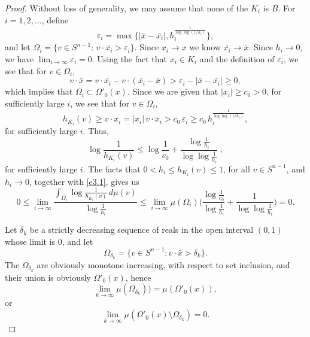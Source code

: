 \documentclass{cpamart1}     %
\theoremstyle{definition}
\theoremstyle{remark}
\newcommand{\sn}{S^{n-1}}
\begin{document}
\begin{proof}
Without loss of generality, we may assume that none of the $K_i$ is $B$.
For $i=1,2,\ldots$, define
\begin{equation*}
 \varepsilon_i=\max\big\{|\bar{x}-\bar{x_i}|,h_i^{\frac1{\log \log(1/h_i)}}\big\},
\end{equation*}
and let $\Omega_i=\{v\in S^{n-1}:\,v\cdot \bar{x_i}>\varepsilon_i\}$.
Since $x_i\to x$ we know $\bar{x_i}\to \bar{x}$. Since $h_i \to 0$, we have $\lim_{i\to\infty}\varepsilon_i=0$.
Using the fact that $x_i\in K_i$ and the definition
of $\varepsilon_i$, we see that for $v\in\Omega_i$,
\[
v\cdot \bar{x}= v\cdot \bar{x_i}-v\cdot (\bar{x_i}-\bar{x})>
\varepsilon_i-|\bar{x}-\bar{x_i}|\geq 0,
\]
which implies that $\Omega_i\subset \Omega'_0(x)$.
Since we are given that $|x_i|\ge c_0>0$, for sufficiently large $i$, we see that for $v\in\Omega_i$,
\[
h_{K_i}(v)\ge v\cdot x_i = |x_i|\, v\cdot \bar x_i > c_0\,
\varepsilon_i \ge c_0\, h_i^\frac1{\log\log(1/h_i)},
\]
for sufficiently large $i$. Thus,
\begin{equation}\label{e3.1}
\log {\frac1{h_{K_i}(v)}}\leq \log\frac{1}{c_0}+
\frac{\log\frac1{h_i}}{\log \log\frac1{h_i}}\ ,
\end{equation}
for sufficiently large $i$.
The facts that $0<h_i\le h_{K_i}(v)\le 1$,
for all $v\in\sn$, and $h_i\to 0$, together with \eqref{e3.1}, gives us
\begin{equation}\label{e3.2}
0\leq\lim_{i\to \infty} \frac{\int_{\Omega_i}\log{\frac1{h_{K_i}(v)}}\,
d\mu(v)}{\log \frac1{h_i}}\leq \lim_{i\to \infty}
\mu(\Omega_i)\Big(\frac{\log \frac1{c_0}}{\log \frac1{h_i}}+\frac{1}
{\log\log\frac1{h_i}}\Big)=0.
\end{equation}


Let $\delta_k$ be a strictly decreasing sequence of reals in the open interval $(0,1)$
whose limit is $0$, and let
\[
\Omega_{\delta_k} = \{ v\in \sn : v\cdot \bar x > \delta_k\}.
\]
The $\Omega_{\delta_k}$ are
obviously monotone increasing, with respect to set inclusion, and their union
is obviously $\Omega'_0(x)$, hence
\[
\lim_{k\to \infty} \mu(\Omega_{\delta_k})) = \mu(\Omega'_0(x)),
\]
or
\begin{equation}\label{n55}
\lim_{k\to \infty} \mu(\Omega'_0(x) \setminus \Omega_{\delta_k}) =0.
\end{equation}




\end{proof}
\end{document}
